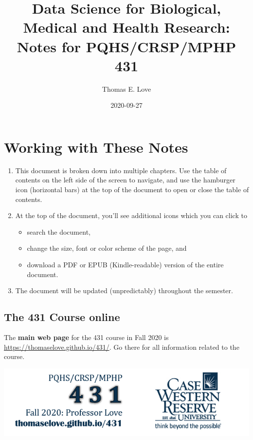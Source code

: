 \documentclass[
]{book}
\title{Data Science for Biological, Medical and Health Research: Notes for PQHS/CRSP/MPHP 431}
\author{Thomas E. Love}
\date{2020-09-27}
\providecommand{\tightlist}{%
  \setlength{\itemsep}{0pt}\setlength{\parskip}{0pt}}
\begin{document}
\maketitle

{
\setcounter{tocdepth}{1}
\tableofcontents
}
\hypertarget{working-with-these-notes}{%
\chapter*{Working with These Notes}\label{working-with-these-notes}}

\begin{enumerate}
\def\labelenumi{\arabic{enumi}.}
\tightlist
\item
  This document is broken down into multiple chapters. Use the table of contents on the left side of the screen to navigate, and use the hamburger icon (horizontal bars) at the top of the document to open or close the table of contents.
\item
  At the top of the document, you'll see additional icons which you can click to

  \begin{itemize}
  \tightlist
  \item
    search the document,
  \item
    change the size, font or color scheme of the page, and
  \item
    download a PDF or EPUB (Kindle-readable) version of the entire document.
  \end{itemize}
\item
  The document will be updated (unpredictably) throughout the semester.
\end{enumerate}

\hypertarget{the-431-course-online}{%
\section*{The 431 Course online}\label{the-431-course-online}}

The \textbf{main web page} for the 431 course in Fall 2020 is \url{https://thomaselove.github.io/431/}. Go there for all information related to the course.

\begin{center}\includegraphics[width=0.8\linewidth]{figures/431_foot2} \end{center}
\end{document}
